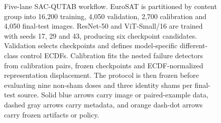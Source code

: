 \begin{figure}[t]
\caption{Five-lane SAC-QUTAB workflow. EuroSAT is partitioned by content group into 16,200 training, 4,050 validation, 2,700 calibration and 4,050 final-test images. ResNet-50 and ViT-Small/16 are trained with seeds 17, 29 and 43, producing six checkpoint candidates. Validation selects checkpoints and defines model-specific different-class control ECDFs. Calibration fits the nested failure detectors from calibration pairs, frozen checkpoints and ECDF-normalized representation displacement. The protocol is then frozen before evaluating nine non-sham doses and three identity shams per final-test source. Solid blue arrows carry image or paired-example data, dashed gray arrows carry metadata, and orange dash-dot arrows carry frozen artifacts or policy.}
\label{fig:framework}
\end{figure}
